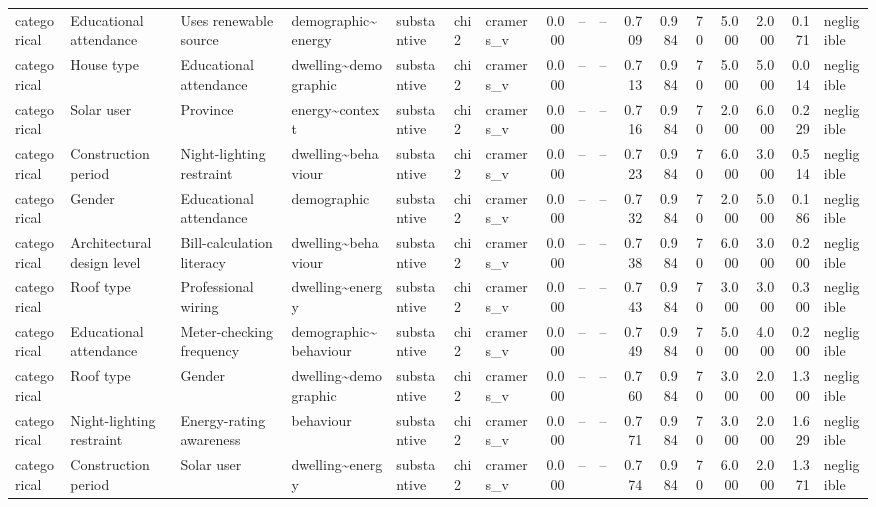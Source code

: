 \begin{table}
\begin{tabular}{lllllllrrrrrrrrrl}
categorical & Educational attendance & Uses renewable source & demographic\textasciitilde energy & substantive & chi2 & cramers\_v & 0.000 & -- & -- & 0.709 & 0.984 & 70 & 5.000 & 2.000 & 0.171 & negligible \\
categorical & House type & Educational attendance & dwelling\textasciitilde demographic & substantive & chi2 & cramers\_v & 0.000 & -- & -- & 0.713 & 0.984 & 70 & 5.000 & 5.000 & 0.014 & negligible \\
categorical & Solar user & Province & energy\textasciitilde context & substantive & chi2 & cramers\_v & 0.000 & -- & -- & 0.716 & 0.984 & 70 & 2.000 & 6.000 & 0.229 & negligible \\
categorical & Construction period & Night-lighting restraint & dwelling\textasciitilde behaviour & substantive & chi2 & cramers\_v & 0.000 & -- & -- & 0.723 & 0.984 & 70 & 6.000 & 3.000 & 0.514 & negligible \\
categorical & Gender & Educational attendance & demographic & substantive & chi2 & cramers\_v & 0.000 & -- & -- & 0.732 & 0.984 & 70 & 2.000 & 5.000 & 0.186 & negligible \\
categorical & Architectural design level & Bill-calculation literacy & dwelling\textasciitilde behaviour & substantive & chi2 & cramers\_v & 0.000 & -- & -- & 0.738 & 0.984 & 70 & 6.000 & 3.000 & 0.200 & negligible \\
categorical & Roof type & Professional wiring & dwelling\textasciitilde energy & substantive & chi2 & cramers\_v & 0.000 & -- & -- & 0.743 & 0.984 & 70 & 3.000 & 3.000 & 0.300 & negligible \\
categorical & Educational attendance & Meter-checking frequency & demographic\textasciitilde behaviour & substantive & chi2 & cramers\_v & 0.000 & -- & -- & 0.749 & 0.984 & 70 & 5.000 & 4.000 & 0.200 & negligible \\
categorical & Roof type & Gender & dwelling\textasciitilde demographic & substantive & chi2 & cramers\_v & 0.000 & -- & -- & 0.760 & 0.984 & 70 & 3.000 & 2.000 & 1.300 & negligible \\
categorical & Night-lighting restraint & Energy-rating awareness & behaviour & substantive & chi2 & cramers\_v & 0.000 & -- & -- & 0.771 & 0.984 & 70 & 3.000 & 2.000 & 1.629 & negligible \\
categorical & Construction period & Solar user & dwelling\textasciitilde energy & substantive & chi2 & cramers\_v & 0.000 & -- & -- & 0.774 & 0.984 & 70 & 6.000 & 2.000 & 1.371 & negligible \\

\end{tabular}
\end{table}

